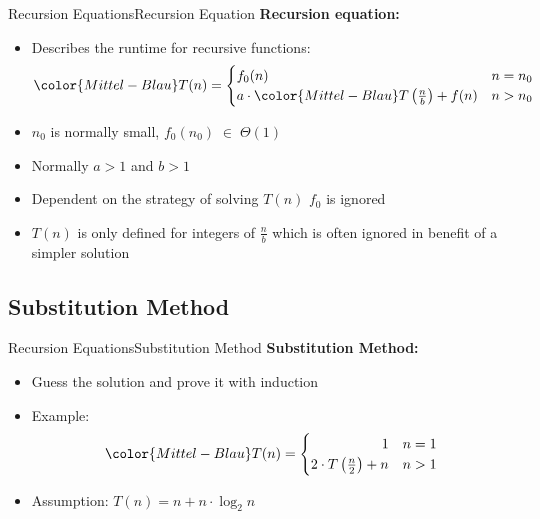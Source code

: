\begin{frame}{Recursion Equations}{Recursion Equation}
  \textbf{Recursion equation:}
  \begin{itemize}
    \item<2->
    Describes the runtime for recursive functions:
    \begin{displaymath}
    {\color{Mittel-Blau}T(n)} = \begin{cases}
      f_0(n) & n = n_0\\
      a \cdot {\color{Mittel-Blau}T\left(\frac{n}{b}\right)} + f(n) & n > n_0
    \end{cases}
    \end{displaymath}
    \item<3->
      {\color{Mittel-Blau}$n_0$} is normally small, {\color{Mittel-Blau}$f_0(n_0) \; \in \; \Theta(1)$}
    \item<4->
      Normally {\color{Mittel-Blau}$a > 1$} and {\color{Mittel-Blau}$b > 1$}
    \item<5->
      Dependent on the strategy of solving {\color{Mittel-Blau}$T(n)$}
      {\color{Mittel-Blau}$f_0$} is ignored
    \item<6->
      {\color{Mittel-Blau}$T(n)$} is only defined for integers of
      {\color{Mittel-Blau}$\frac{n}{b}$} which is often ignored in benefit of
      a simpler solution
  \end{itemize}
\end{frame}


\subsection{Substitution Method}

\begin{frame}{Recursion Equations}{Substitution Method}
  \textbf{Substitution Method:}
  \begin{itemize}
    \item<2->
      Guess the solution and prove it with induction
    \item<3->
      Example:
      \begin{displaymath}
        \color{Mittel-Blau}
        T(n) = \begin{cases}
          \hfill 1 & n = 1\\
          2 \cdot T\left(\frac{n}{2}\right) + n & n > 1
        \end{cases}
      \end{displaymath}
    \item<4->
      Assumption:  {\color{Mittel-Blau}$T(n) = n + n \cdot \log_2 n$}
  \end{itemize}
\end{frame}

